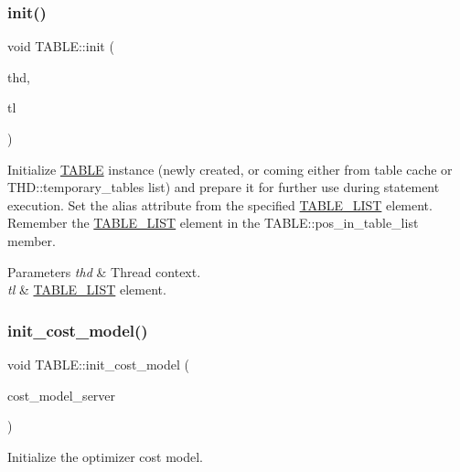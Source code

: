 \subsubsection{\texorpdfstring{init()}{init()}}
{\footnotesize\ttfamily void T\+A\+B\+L\+E\+::init (\begin{DoxyParamCaption}\item[{T\+HD $\ast$}]{thd,  }\item[{\mbox{\hyperlink{structTABLE__LIST}{T\+A\+B\+L\+E\+\_\+\+L\+I\+ST}} $\ast$}]{tl }\end{DoxyParamCaption})}

Initialize \mbox{\hyperlink{structTABLE}{T\+A\+B\+LE}} instance (newly created, or coming either from table cache or T\+H\+D\+::temporary\+\_\+tables list) and prepare it for further use during statement execution. Set the \textquotesingle{}alias\textquotesingle{} attribute from the specified \mbox{\hyperlink{structTABLE__LIST}{T\+A\+B\+L\+E\+\_\+\+L\+I\+ST}} element. Remember the \mbox{\hyperlink{structTABLE__LIST}{T\+A\+B\+L\+E\+\_\+\+L\+I\+ST}} element in the T\+A\+B\+L\+E\+::pos\+\_\+in\+\_\+table\+\_\+list member.


\begin{DoxyParams}{Parameters}
{\em thd} & Thread context. \\
\hline
{\em tl} & \mbox{\hyperlink{structTABLE__LIST}{T\+A\+B\+L\+E\+\_\+\+L\+I\+ST}} element. \\
\hline
\end{DoxyParams}
\mbox{\label{structTABLE_a78110c9df0b2db3c47ec226cff4c5ffb}} 
\subsubsection{\texorpdfstring{init\+\_\+cost\+\_\+model()}{init\_cost\_model()}}
{\footnotesize\ttfamily void T\+A\+B\+L\+E\+::init\+\_\+cost\+\_\+model (\begin{DoxyParamCaption}\item[{const \mbox{\hyperlink{classCost__model__server}{Cost\+\_\+model\+\_\+server}} $\ast$}]{cost\+\_\+model\+\_\+server }\end{DoxyParamCaption})\hspace{0.3cm}{\ttfamily [inline]}}

Initialize the optimizer cost model.

